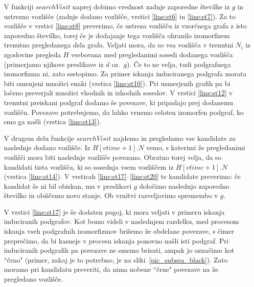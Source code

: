 \documentclass[a4paper, 12pt, ]{book}
\begin{document}
	V funkciji $searchVisit$ naprej dobimo vrednost zadnje zaporedne številke iz $g$ in ustrezno vozlišče (zadnje dodano vozlišče, vrstici \ref{line:st6}
	in  \ref{line:st7}). Za to vozlišče v vrstici \ref{line:st8} preverimo, če ustreza vozlišču iz vzorčnega grafa z isto zaporedno številko, torej če je
	dodajanje tega vozlišča ohranilo izomorfizem trenutno pregledanega dela grafa. Veljati mora, da so vsa vozlišča v trenutni $N_i$ iz zgodovine
	pregleda $H$ vsebovana med pregledanimi sosedi dodanega vozlišča (primerjamo njihove preslikave iz $d$ oz.~$g$). Če to ne velja, tudi podgrafnega
	izomorfizma ni, zato sestopimo. Za primer iskanja induciranega podgrafa morata biti omenjeni množici enaki (vrstica  \ref{line:st10}). Pri usmerjenih
	grafih pa bi ločeno preverjali množici vhodnih in izhodnih sosedov. V vrstici \ref{line:st12} v trenutni preiskani podgraf dodamo še povezave, ki
	pripadajo prej dodanemu vozlišču. Povezave potrebujemo, da lahko vrnemo celoten izomorfen podgraf, ko smo ga našli (vrstica  \ref{line:st13}).
	
	V drugem delu funkcije $searchVisit$ najdemo in pregledamo vse kandidate za naslednje dodano vozlišče. Iz $H[vtime + 1].N$ vemo, s katerimi že 
	pregledanimi vozlišči mora biti naslednje vozlišče povezano. Obratno torej velja, da so kandidati tista vozlišča, ki so sosednja vsem vozliščem iz 
	$H[vtime + 1].N$ (vrstica \ref{line:st14}). V vrsticah \ref{line:st17}--\ref{line:st20} te kandidate preverimo: če kandidat še ni bil obiskan, mu
	v preslikavi $g$ določimo naslednjo zaporedno številko in obiščemo novo stanje. Ob vrnitvi razveljavimo spremembo v $g$.
	
	V vrstici \ref{line:st17} je še dodaten pogoj, ki mora veljati v primeru iskanja induciranih podgrafov. Kot bomo videli v naslednjem razdelku, med
	procesom iskanja vseh podgrafnih izomorfizmov brišemo že obdelane povezave, s čimer preprečimo, da bi kasneje v procesu iskanja ponovno našli 
	isti podgraf. Pri induciranih podgrafih pa povezave ne smemo brisati, ampak jo označimo kot ``črno" (primer, zakaj je to potrebno, je na 
	sliki~\ref{pic_subsea_black}). Zato moramo pri kandidatu preveriti, da nima nobene ``črne" povezave na že pregledano vozlišče.
	
\end{document}
